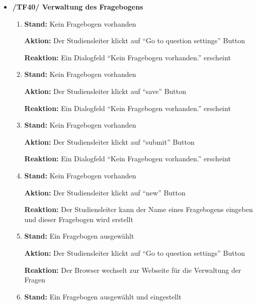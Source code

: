 \documentclass[a4paper]{scrreprt}
\begin{document}
\begin{itemize}
                \item \textbf{/TF40/ Verwaltung des Fragebogens}
                    \begin{enumerate}
                        \item \par \textbf{Stand: }Kein Fragebogen vorhanden
                              \par \textbf{Aktion: }Der \gls{Studiensleiter} klickt auf ``Go to question settings'' Button
                              \par \textbf{Reaktion: }Ein Dialogfeld ``Kein Fragebogen vorhanden.'' erscheint
                        \item \par \textbf{Stand: } Kein Fragebogen vorhanden
                              \par \textbf{Aktion: }Der \gls{Studiensleiter} klickt auf ``save'' Button
                              \par \textbf{Reaktion: }Ein Dialogfeld ``Kein Fragebogen vorhanden.'' erscheint
                        \item \par \textbf{Stand: }Kein Fragebogen vorhanden
                              \par \textbf{Aktion: }Der \gls{Studiensleiter} klickt auf ``submit'' Button
                              \par \textbf{Reaktion: }Ein Dialogfeld ``Kein Fragebogen vorhanden.'' erscheint
                        \item \par \textbf{Stand: }Kein Fragebogen vorhanden
                              \par \textbf{Aktion: }Der \gls{Studiensleiter} klickt auf ``new'' Button
                              \par \textbf{Reaktion: }Der \gls{Studiensleiter} kann der Name eines Fragebogens eingeben und dieser Fragebogen wird erstellt
                        \item \par \textbf{Stand: }Ein Fragebogen ausgewählt
                              \par \textbf{Aktion: }Der \gls{Studiensleiter} klickt auf ``Go to question settings'' Button
                              \par \textbf{Reaktion: }Der Browser wechselt zur Webseite für die Verwaltung der Fragen
                        \item \par \textbf{Stand: }Ein Fragebogen ausgewählt und eingestellt

\end{enumerate}
\end{itemize}
\end{document}
